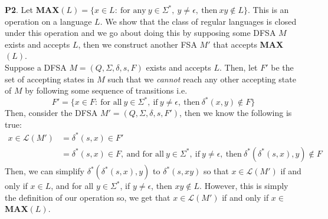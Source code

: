\documentclass{article}
\begin{document}
    \textbf{P2}.
    Let \textbf{MAX}$(L) = \{x\in L:\:\text{for any}\:y\in\Sigma^{*},\:y\neq\epsilon,\:\text{then}\:xy\not\in L\}$. This is an operation on
    a language $L$. We show that the class of regular languages is closed under this operation and we go about doing this by supposing
    some DFSA $M$ exists and accepts $L$, then we construct another FSA $M'$ that accepts \textbf{MAX}$(L)$.\\
    Suppose a DFSA $M = (Q,\Sigma,\delta,s,F)$ exists and accepts $L$. Then, let $F'$ be the set of accepting states in $M$ such that
    we \textit{cannot} reach any other accepting state of $M$ by following some sequence of transitions i.e.
    \[ F' = \{x\in F:\:\text{for all}\:y\in\Sigma^{*},\:\text{if}\:y\neq\epsilon,\:\text{then}\:\delta^{*}(x,y)\not\in F\} \]
    Then, consider the DFSA $M' = (Q,\Sigma,\delta,s,F')$, then we know the following is true:
    \begin{align*}
        x\in\mathcal{L}(M') &= \delta^{*}(s,x)\in F' \\
        &= \delta^{*}(s,x)\in F,\:\text{and for all}\:y\in\Sigma^{*},\:\text{if}\:y\neq\epsilon,\:\text{then}\:\delta^{*}(\delta^{*}(s,x),y)\not\in F
    \end{align*}
    Then, we can simplify $\delta^{*}(\delta^{*}(s,x),y)$ to $\delta^{*}(s,xy)$ so that $x\in \mathcal{L}(M')$ if and only if $x\in L$, and for
    all $y\in\Sigma^{*}$, if $y\neq\epsilon$, then $xy\not\in L$. However, this is simply the definition of our operation so, we get that
    $x\in\mathcal{L}(M')$ if and only if $x\in$ \textbf{MAX}$(L)$.

    
\end{document}
